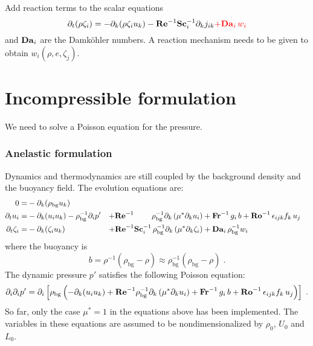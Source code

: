 Add reaction terms to the scalar equations
\begin{equation}
    \partial_t (\rho \zeta_i)= -\partial_k (\rho \zeta_i u_k)
    - \mathrm{\bf Re}^{-1}\mathrm{\bf Sc}_i^{-1} \partial_k j_{ik} \color{red}{+\mathrm{\bf Da}_i\,w_i}
\end{equation}
and $\mathrm{\bf Da}_i$ are the Damk{\"o}hler numbers. A reaction mechanism needs to be given to obtain $w_i(\rho,e,\zeta_j)$.

\section{Incompressible formulation}

We need to solve a Poisson equation for the pressure.

\subsubsection{Anelastic formulation}

Dynamics and thermodynamics are still coupled by the background density and the buoyancy field. The evolution equations are:
\begin{subequations}
    \begin{align}
        0                 =& -\partial_k(\rho_\mathrm{bg}u_k)   & \\
        \partial_t  u_i   =& -\partial_k ( u_i u_k )-\rho_\mathrm{bg}^{-1}\partial_i p' &
        +\mathrm{\bf Re}^{-1}\qquad\;\rho_\mathrm{bg}^{-1}\partial_k \left( \mu^{*} \partial_k u_i\right) & +\mathrm{\bf Fr}^{-1}\, g_i\,b+\mathrm{\bf Ro}^{-1}\,\epsilon_{ijk} f_k\,u_j  \\
        \partial_t\zeta_i =& -\partial_k (\zeta_i u_k) &
        + \mathrm{\bf Re}^{-1}\mathrm{\bf Sc}_i^{-1}\, \rho_\mathrm{bg}^{-1}\partial_k \left( \mu^{*}\partial_k\zeta_i\right) &+ \mathrm{\bf Da}_i\,\rho_\mathrm{bg}^{-1}w_i
    \end{align}
\end{subequations}
where the buoyancy is
\begin{equation}
    b=\rho^{-1}(\rho_\mathrm{bg}-\rho)\approx\rho_\mathrm{bg}^{-1}(\rho_\mathrm{bg}-\rho) \;.
\end{equation}
The dynamic pressure $p'$ satisfies the following Poisson equation:
\begin{equation}
    \partial_i\partial_ip'=\partial_i\left[\rho_\mathrm{bg}\left(
    -\partial_k ( u_i u_k )+\mathrm{\bf Re}^{-1}\rho_\mathrm{bg}^{-1}\partial_k \left( \mu^{*} \partial_k u_i\right) +\mathrm{\bf Fr}^{-1}\, g_i\,b+\mathrm{\bf Ro}^{-1}\,\epsilon_{ijk} f_k\,u_j
    \right)\right]\;.
\end{equation}
So far, only the case $\mu^*=1$ in the equations above has been implemented. The variables in these equations are assumed to be nondimensionalized by $\rho_0$, $U_0$ and $L_0$.

